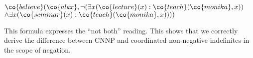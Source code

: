 \documentclass[output=paper]{langsci/langscibook}
\begin{document}
\ea \label{ex-glaub-notEX2-bi}
$\co{believe}(\co{alex},\lnot (\exists x (\co{lecture}(x) : \co{teach}(\co{monika},x))$\\
\hspace*{\fill}
$\land \exists x (\co{seminar}(x) : \co{teach}(\co{monika},x))))$
\z 

This formula expresses the ``not both'' reading. This shows that we correctly derive the difference between CNNP and coordinated non-negative indefinites in the scope of negation.











\end{document}
